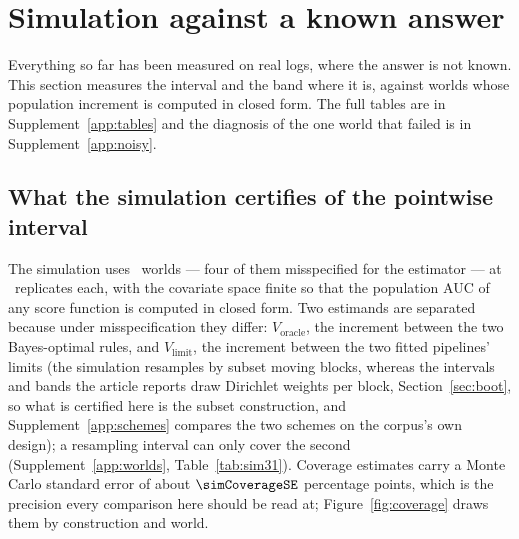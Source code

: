 \section{Simulation against a known answer}
\label{sec:sim}

Everything so far has been measured on real logs, where the answer is not
known. This section measures the interval and the band where it is, against
worlds whose population increment is computed in closed form. The full tables are in
Supplement~\ref{app:tables} and the diagnosis of the one world that failed is
in Supplement~\ref{app:noisy}.

\subsection{What the simulation certifies of the pointwise interval}
\label{sec:simworlds}
\label{sec:simcoverage}
\label{sec:simsensitivity}

The simulation uses \nWorlds\ worlds --- four of them misspecified for the
estimator --- at \nSimReps\ replicates each, with the covariate space finite
so that the population AUC of any score function is computed in closed form.
Two estimands are separated because under misspecification they differ:
$V_{\mathrm{oracle}}$, the increment between the two Bayes-optimal rules, and
$V_{\mathrm{limit}}$, the increment between the two fitted pipelines' limits
(the simulation resamples by subset moving blocks, whereas the intervals
and bands the article reports draw Dirichlet weights per block,
Section~\ref{sec:boot}, so what is certified here is the subset
construction, and Supplement~\ref{app:schemes} compares the two schemes on
the corpus's own design);
a resampling interval can only cover the second (Supplement~\ref{app:worlds},
Table~\ref{tab:sim31}). Coverage estimates carry a Monte Carlo standard error
of about $\simCoverageSE$ percentage points, which is the precision every
comparison here should be read at; Figure~\ref{fig:coverage} draws them by
construction and world.

